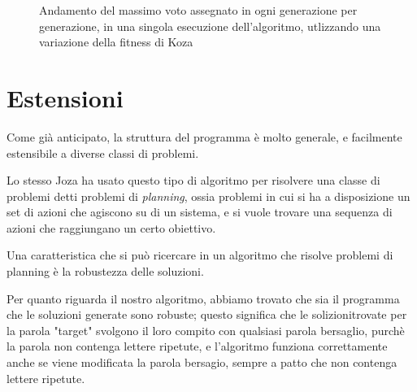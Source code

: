 \documentclass[paper=a4, fontsize=11pt]{scrartcl}
\numberwithin{equation}{section}		%
\numberwithin{figure}{section}			%
\numberwithin{table}{section}				%
\begin{document}
\begin{figure}

\caption{Andamento del massimo voto assegnato in ogni generazione per generazione, in una singola esecuzione dell'algoritmo, utlizzando una variazione della fitness di Koza}
\end{figure}





\section{Estensioni}
Come già anticipato, la struttura del programma è molto generale, e facilmente estensibile a diverse classi di problemi.

Lo stesso Joza ha usato questo tipo di algoritmo per risolvere una classe di problemi detti problemi di \emph{planning}, ossia problemi in cui si ha a disposizione un set di azioni che agiscono su di un sistema, e si vuole trovare una sequenza di azioni che raggiungano un certo obiettivo.

Una caratteristica che si può ricercare in un algoritmo che risolve problemi di planning è la robustezza delle soluzioni.

Per quanto riguarda il nostro algoritmo, abbiamo trovato che sia il programma che le soluzioni generate sono robuste; questo significa che le solizionitrovate per la parola "target" svolgono il loro compito con qualsiasi parola bersaglio, purchè la parola non contenga lettere ripetute, e l'algoritmo funziona correttamente anche se viene modificata la parola bersagio, sempre a patto che non contenga lettere ripetute.
\end{document}
